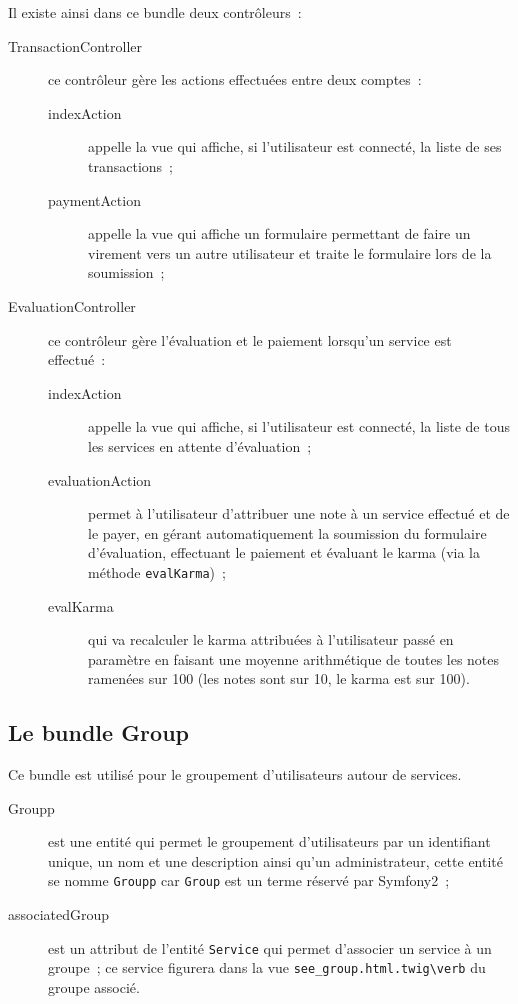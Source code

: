 Il existe ainsi dans ce bundle deux contrôleurs~:
\begin{description}
    \item[TransactionController] ce contrôleur gère les actions effectuées entre deux comptes~:
    \begin{description}
        \item[indexAction] appelle la vue qui affiche, si l'utilisateur est connecté, la liste de ses transactions~;
        \item[paymentAction] appelle la vue qui affiche un formulaire permettant de faire un virement vers un autre utilisateur et traite le formulaire lors de la soumission~;
    \end{description}
    \item[EvaluationController] ce contrôleur gère l'évaluation et le paiement lorsqu'un service est effectué~:
    \begin{description}
        \item[indexAction] appelle la vue qui affiche, si l'utilisateur est connecté, la liste de tous les services en attente d'évaluation~;
        \item[evaluationAction] permet à l'utilisateur d'attribuer une note à un service effectué et de le payer, en gérant automatiquement la soumission du formulaire d'évaluation, effectuant le paiement et évaluant le karma (via la méthode \verb|evalKarma|)~;
        \item[evalKarma] qui va recalculer le karma attribuées à l'utilisateur passé en paramètre en faisant une moyenne arithmétique de toutes les notes ramenées sur 100 (les notes sont sur 10, le karma est sur 100).
    \end{description}
\end{description}

\subsection{Le bundle Group}

Ce bundle est utilisé pour le groupement d'utilisateurs autour de services.

\begin{description}
    \item [Groupp] est une entité qui permet le groupement d'utilisateurs par un identifiant unique, un nom et une description ainsi qu'un administrateur, cette entité se nomme \verb|Groupp| car \verb|Group| est un terme réservé par Symfony2~;
    \item [associatedGroup] est un attribut de l'entité \verb|Service| qui permet d'associer un service à un groupe~; ce service figurera dans la vue \verb|see_group.html.twig\verb| du groupe associé.
\end{description} 

